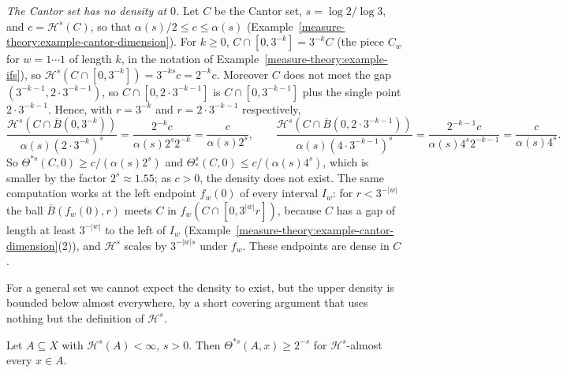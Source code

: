 \begin{example}\label{measure-theory:example-density-cantor}
\emph{The Cantor set has no density at $0$.} Let $C$ be the Cantor set, $s = \log 2/\log 3$, and $c = \mathcal{H}^s(C)$, so that $\alpha(s)/2 \leq c \leq \alpha(s)$
(Example~\ref{measure-theory:example-cantor-dimension}). For $k \geq 0$, $C \cap [0, 3^{-k}] = 3^{-k}C$ (the piece $C_w$ for $w = 1\cdots1$ of length $k$, in the notation of
Example~\ref{measure-theory:example-ifs}), so $\mathcal{H}^s(C \cap [0, 3^{-k}]) = 3^{-ks}c = 2^{-k}c$. Moreover $C$ does not meet the gap $(3^{-k-1}, 2 \cdot 3^{-k-1})$, so
$C \cap [0, 2 \cdot 3^{-k-1}]$ is $C \cap [0, 3^{-k-1}]$ plus the single point $2 \cdot 3^{-k-1}$. Hence, with $r = 3^{-k}$ and $r = 2 \cdot 3^{-k-1}$ respectively,
\[
\frac{\mathcal{H}^s(C \cap \overline{B}(0, 3^{-k}))}{\alpha(s)(2 \cdot 3^{-k})^s} = \frac{2^{-k}c}{\alpha(s)2^s2^{-k}} = \frac{c}{\alpha(s)2^s}, \qquad
\frac{\mathcal{H}^s(C \cap \overline{B}(0, 2 \cdot 3^{-k-1}))}{\alpha(s)(4 \cdot 3^{-k-1})^s} = \frac{2^{-k-1}c}{\alpha(s)4^s2^{-k-1}} = \frac{c}{\alpha(s)4^s}.
\]
So $\Theta^{*s}(C, 0) \geq c/(\alpha(s)2^s)$ and $\Theta^s_*(C, 0) \leq c/(\alpha(s)4^s)$, which is smaller by the factor $2^s \approx 1.55$; as $c > 0$, the density does not exist. The same computation
works at the left endpoint $f_w(0)$ of every interval $I_w$: for $r < 3^{-|w|}$ the ball $\overline{B}(f_w(0), r)$ meets $C$ in $f_w(C \cap [0, 3^{|w|}r])$, because $C$ has a gap of length at least
$3^{-|w|}$ to the left of $I_w$ (Example~\ref{measure-theory:example-cantor-dimension}(2)), and $\mathcal{H}^s$ scales by $3^{-|w|s}$ under $f_w$. These endpoints are dense in $C$.
\end{example}

For a general set we cannot expect the density to exist, but the upper density is bounded below almost everywhere, by a short covering argument that uses nothing but the definition of $\mathcal{H}^s$.

\begin{theorem}\label{measure-theory:theorem-upper-density}
Let $A \subseteq X$ with $\mathcal{H}^s(A) < \infty$, $s > 0$. Then $\Theta^{*s}(A, x) \geq 2^{-s}$ for $\mathcal{H}^s$-almost every $x \in A$.
\end{theorem}

